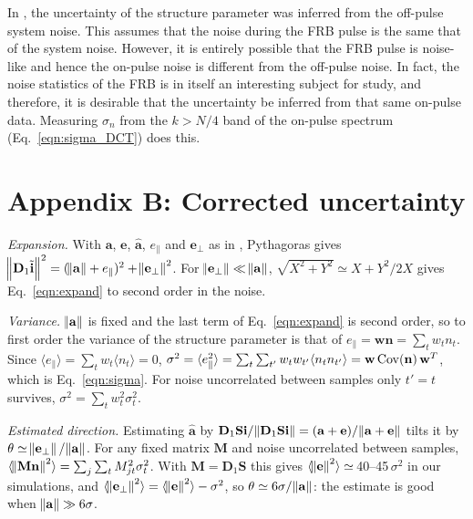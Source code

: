 \documentclass[twocolumn]{aastex631}
\begin{document}
In \citet{Gajjar_2018}, the uncertainty of the structure parameter was inferred from the off-pulse system noise. This assumes that the noise during the FRB pulse is the same that of the system noise. However, it is entirely possible that the FRB pulse is noise-like and hence the on-pulse noise is different from the off-pulse noise. In fact, the noise statistics of the FRB is in itself an interesting subject for study, and therefore, it is desirable that the uncertainty be inferred from that same on-pulse data. Measuring $\sigma_n$ from the $k>N/4$ band of the on-pulse spectrum (Eq.~\ref{eqn:sigma_DCT}) does this.

\section*{Appendix B: Corrected uncertainty} \label{sec:appB}
\textit{Expansion.} With $\mathbf{a}$, $\mathbf{e}$, $\hat{\mathbf{a}}$, $e_\parallel$ and $\mathbf{e}_\perp$ as in , Pythagoras gives $\norm{\mathbf{D}_1\tilde{\mathbf{i}}}^2=(\norm{\mathbf{a}}+e_\parallel)^2+\norm{\mathbf{e}_\perp}^2$. For $\norm{\mathbf{e}_\perp}\ll\norm{\mathbf{a}}$, $\sqrt{X^2+Y^2}\simeq X+Y^2/2X$ gives Eq.~\eqref{eqn:expand} to second order in the noise.

\textit{Variance.} $\norm{\mathbf{a}}$ is fixed and the last term of Eq.~\eqref{eqn:expand} is second order, so to first order the variance of the structure parameter is that of $e_\parallel=\mathbf{w}\mathbf{n}=\sum_tw_tn_t$. Since $\langle e_\parallel\rangle=\sum_tw_t\langle n_t\rangle=0$, $\sigma^2=\langle e_\parallel^2\rangle=\sum_t\sum_{t'}w_tw_{t'}\langle n_tn_{t'}\rangle=\mathbf{w}\,{\rm Cov}(\mathbf{n})\,\mathbf{w}^T$, which is Eq.~\eqref{eqn:sigma}. For noise uncorrelated between samples only $t'=t$ survives, $\sigma^2=\sum_tw_t^2\sigma_t^2$.

\textit{Estimated direction.} Estimating $\hat{\mathbf{a}}$ by $\mathbf{D}_1\mathbf{S}\mathbf{i}/\norm{\mathbf{D}_1\mathbf{S}\mathbf{i}}=(\mathbf{a}+\mathbf{e})/\norm{\mathbf{a}+\mathbf{e}}$ tilts it by $\theta\simeq\norm{\mathbf{e}_\perp}/\norm{\mathbf{a}}$. For any fixed matrix $\mathbf{M}$ and noise uncorrelated between samples, $\langle\norm{\mathbf{M}\mathbf{n}}^2\rangle=\sum_j\sum_tM_{jt}^2\sigma_t^2$. With $\mathbf{M}=\mathbf{D}_1\mathbf{S}$ this gives $\langle\norm{\mathbf{e}}^2\rangle\simeq$\,40--45\,$\sigma^2$ in our simulations, and $\langle\norm{\mathbf{e}_\perp}^2\rangle=\langle\norm{\mathbf{e}}^2\rangle-\sigma^2$, so $\theta\simeq6\sigma/\norm{\mathbf{a}}$: the estimate is good when $\norm{\mathbf{a}}\gg6\sigma$.
\end{document}
